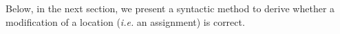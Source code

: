 \documentclass[a4paper]{llncs}
\newcommand{\defn}[1]{\:\hat{#1}\:}
\newcommand{\java}{\textsc{Java}}
\begin{document}

Below, in the next section, we present a syntactic method to derive
whether a modification of a location (\emph{i.e.} an assignment) is
correct. 














\end{document}
